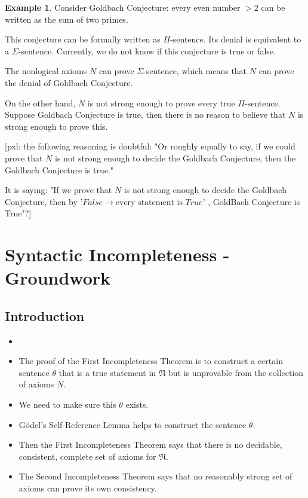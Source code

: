 \documentclass[11pt,letterpaper]{book}
\theoremstyle{definition}
\newtheorem{example}{Example}[section]
\begin{document}
\begin{example}
Consider Goldbach Conjecture: every even number $> 2$ can be written as
the sum of two primes.

This conjecture can be formally written as $\Pi$-sentence. Its denial is
equivalent to a $\Sigma$-sentence. Currently, we do not know if this
conjecture is true or false.

The nonlogical axioms $N$ can prove $\Sigma$-sentence, which means that
$N$ can prove the denial of Goldbach Conjecture.

On the other hand, $N$ is not strong enough to prove every true
$\Pi$-sentence. Suppose Goldbach Conjecture is true, then there is no
reason to believe that $N$ is strong enough to prove this.

{\color{red}[pxl: the following reasoning is doubtful: "Or roughly equally to say, if we could prove that $N$ is not strong enough to decide the Goldbach Conjecture, then the Goldbach Conjecture is true." 

It is saying: "If we prove that $N$ is not strong enough to decide the Goldbach Conjecture, then by '$False \rightarrow \text{every statement is }True$' , GoldBach Conjecture is True"?]}

\end{example}


\chapter{Syntactic Incompleteness - Groundwork}


\section{Introduction}


\begin{itemize}
\item[]
\item{The proof of the First Incompleteness Theorem is to construct a
certain sentence $\theta$ that is a true statement in $\mathfrak{N}$ but
is unprovable from the collection of axioms $N$.}

\item{We need to make sure this $\theta$ exists.}

\item{G\"odel's Self-Reference Lemma helps to construct the sentence
$\theta$.}
\item{Then the First Incompleteness Theorem says that there is no
decidable, consistent, complete set of axioms for $\mathfrak{N}$.}
\item{The Second Incompleteness Theorem says that no reasonably strong
set of axioms can prove its own consistency. }

\end{itemize}
\end{document}

